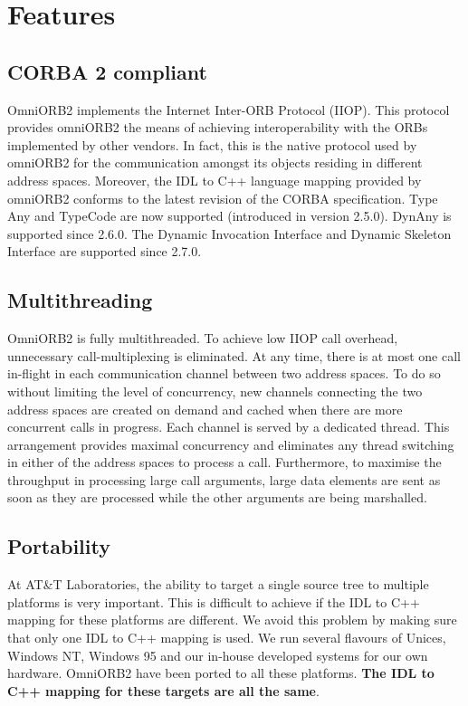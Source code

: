 \documentclass[11pt,twoside,onecolumn]{book}
\begin{document}
\section{Features}

\subsection{CORBA 2 compliant}

OmniORB2 implements the Internet Inter-ORB Protocol (IIOP).
This protocol provides omniORB2 the means of achieving interoperability
with the ORBs implemented by other vendors. In fact, this is the
native protocol used by omniORB2 for the communication amongst its objects
residing in different address spaces. Moreover, the IDL to C++ language
mapping provided by omniORB2 conforms to the latest revision of the CORBA
specification. Type Any and TypeCode are now supported (introduced in version
2.5.0). DynAny is supported since 2.6.0. The Dynamic Invocation Interface
and Dynamic Skeleton Interface are supported since 2.7.0.

\subsection{Multithreading}

OmniORB2 is fully multithreaded. To achieve low IIOP call overhead,
unnecessary call-multiplexing is eliminated. At any time, there is at most
one call in-flight in each communication channel between two address
spaces. To do so without limiting the level of concurrency, new channels
connecting the two address spaces are created on demand and cached when
there are more concurrent calls in progress. Each channel is served by a
dedicated thread. This arrangement provides maximal concurrency and
eliminates any thread switching in either of the address spaces to process
a call. Furthermore, to maximise the throughput in processing large call
arguments, large data elements are sent as soon as they are processed while
the other arguments are being marshalled.

\subsection{Portability}

At AT\&T Laboratories, the ability to target a single source tree to
multiple platforms is
very important. This is difficult to achieve if the IDL to C++ mapping for
these platforms are different. We avoid this problem by making sure that
only one IDL to C++ mapping is used. We run several flavours of Unices, Windows
NT, Windows 95 and our in-house developed systems for our own
hardware. OmniORB2 have been ported to all these platforms. {\bf The IDL to
C++ mapping for these targets are all the same}.
\end{document}
